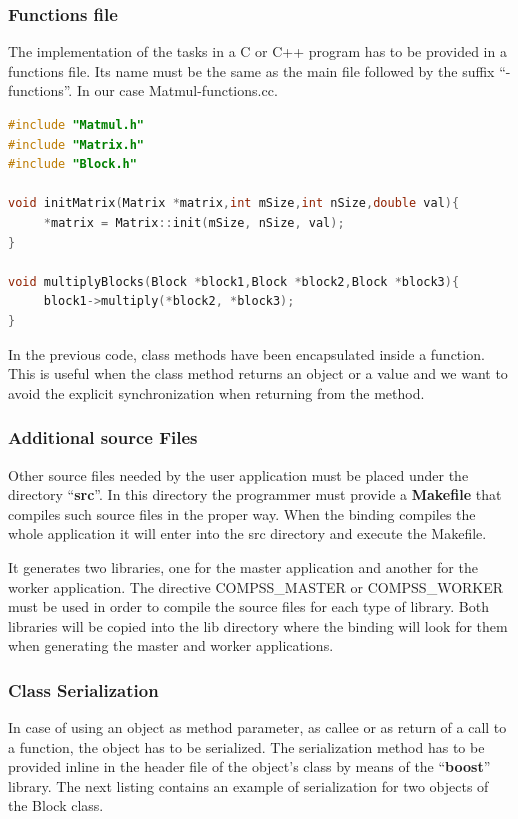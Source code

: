 \subsubsection{Functions file}
The implementation of the tasks in a C or C++ program has to be provided in a functions file. 
Its name must be the same as the main file followed by the suffix ``-functions''. In our case Matmul-functions.cc.

\begin{lstlisting}[language=C++]
#include "Matmul.h"
#include "Matrix.h"
#include "Block.h"

void initMatrix(Matrix *matrix,int mSize,int nSize,double val){
     *matrix = Matrix::init(mSize, nSize, val);
}

void multiplyBlocks(Block *block1,Block *block2,Block *block3){
     block1->multiply(*block2, *block3);
}
\end{lstlisting}

In the previous code, class methods have been encapsulated inside a function. 
This is useful when the class method returns an object or a value and we want to avoid the explicit 
synchronization when returning from the method.

\subsubsection{Additional source Files}
Other source files needed by the user application must be placed under the directory ``{\bf src}''.
In this directory the programmer must provide a {\bf Makefile} that compiles such source files in the proper way. 
When the binding compiles the whole application it will enter into the src directory and execute the Makefile.
 
It generates two libraries, one for the master application and another for the worker application. 
The directive COMPSS\_MASTER or COMPSS\_WORKER must be used in order to compile the source files for each type of library. 
Both libraries will be copied into the lib directory where the binding will look for them when generating the master and worker applications.

\subsubsection{Class Serialization}
In case of using an object as method parameter, as callee or as return of a call to a function, the object has to be serialized. The serialization method has to be provided inline in the header file of the object's class by means of the ``{\bf boost}'' library. The next listing contains an example of serialization for two objects of the Block class.

